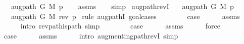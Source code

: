 \begin{isabellebody}
\ \ \ {\isachardoublequoteopen}augpath\ G\ M\ p{\isachardoublequoteclose}%
\endisataginvisible
{\isafoldinvisible}%
%
\isadeliminvisible
\isanewline
%
\endisadeliminvisible
%
\isadelimproof
\ \ %
\endisadelimproof
%
\isatagproof
{}\isamarkupfalse%
\ assms\isanewline
\ \ \isamarkupfalse%
\ simp%
\endisatagproof
{\isafoldproof}%
%
\isadelimproof
\isanewline
%
\endisadelimproof
\isanewline
{}\isamarkupfalse%
\ augpath{\isacharunderscore}{\kern0pt}revI{\isacharcolon}{\kern0pt}\isanewline
\ \ \ {\isachardoublequoteopen}augpath\ G\ M\ p{\isachardoublequoteclose}\isanewline
\ \ \ {\isachardoublequoteopen}augpath\ G\ M\ {\isacharparenleft}{\kern0pt}rev\ p{\isacharparenright}{\kern0pt}{\isachardoublequoteclose}\isanewline
%
\isadelimproof
%
\endisadelimproof
%
\isatagproof
{}\isamarkupfalse%
\ {\isacharparenleft}{\kern0pt}rule\ augpathI{\isacharcomma}{\kern0pt}\ goal{\isacharunderscore}{\kern0pt}cases{\isacharparenright}{\kern0pt}\isanewline
\ \ \isamarkupfalse%
\ {}\isanewline
\ \ \isamarkupfalse%
\ {\isacharquery}{\kern0pt}case\isanewline
\ \ \ \ \isamarkupfalse%
\ assms\isanewline
\ \ \ \ \isamarkupfalse%
\ {\isacharparenleft}{\kern0pt}intro\ rev{\isacharunderscore}{\kern0pt}path{\isacharunderscore}{\kern0pt}is{\isacharunderscore}{\kern0pt}path{\isacharparenright}{\kern0pt}\ simp\isanewline
{}\isamarkupfalse%
\isanewline
\ \ \isamarkupfalse%
\ {}\isanewline
\ \ \isamarkupfalse%
\ {\isacharquery}{\kern0pt}case\isanewline
\ \ \ \ \isamarkupfalse%
\ assms\isanewline
\ \ \ \ \isamarkupfalse%
\ force\isanewline
{}\isamarkupfalse%
\isanewline
\ \ \isamarkupfalse%
\ {}\isanewline
\ \ \isamarkupfalse%
\ {\isacharquery}{\kern0pt}case\isanewline
\ \ \ \ \isamarkupfalse%
\ assms\isanewline
\ \ \ \ \isamarkupfalse%
\ {\isacharparenleft}{\kern0pt}intro\ augmenting{\isacharunderscore}{\kern0pt}path{\isacharunderscore}{\kern0pt}revI{\isacharparenright}{\kern0pt}\ simp\isanewline
{}\isamarkupfalse%
%
\endisatagproof
{\isafoldproof}%
%
\isadelimproof
\isanewline
%
\endisadelimproof
%
\isadelimtheory
\isanewline
%
\endisadelimtheory
%
\isatagtheory
{}\isamarkupfalse%
%
\endisatagtheory
{\isafoldtheory}%
%
\isadelimtheory
%
\endisadelimtheory
%
\end{isabellebody}%
